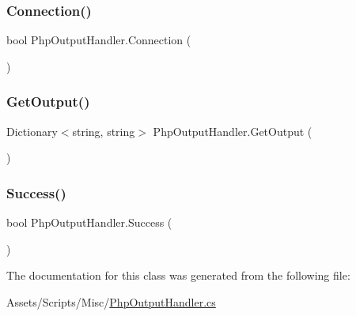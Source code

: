\subsubsection{\texorpdfstring{Connection()}{Connection()}}
{\footnotesize\ttfamily bool Php\+Output\+Handler.\+Connection (\begin{DoxyParamCaption}{ }\end{DoxyParamCaption})\hspace{0.3cm}{\ttfamily [inline]}}

\mbox{\label{classPhpOutputHandler_a0f74d89c9ae20505c5c2db462e477308}} 
\subsubsection{\texorpdfstring{Get\+Output()}{GetOutput()}}
{\footnotesize\ttfamily Dictionary$<$string, string$>$ Php\+Output\+Handler.\+Get\+Output (\begin{DoxyParamCaption}{ }\end{DoxyParamCaption})\hspace{0.3cm}{\ttfamily [inline]}}

\mbox{\label{classPhpOutputHandler_a4dc68556b5bc70042ce58328df9d7d98}} 
\subsubsection{\texorpdfstring{Success()}{Success()}}
{\footnotesize\ttfamily bool Php\+Output\+Handler.\+Success (\begin{DoxyParamCaption}{ }\end{DoxyParamCaption})\hspace{0.3cm}{\ttfamily [inline]}}



The documentation for this class was generated from the following file\+:\begin{DoxyCompactItemize}
\item 
Assets/\+Scripts/\+Misc/\hyperlink{PhpOutputHandler_8cs}{Php\+Output\+Handler.\+cs}\end{DoxyCompactItemize}
